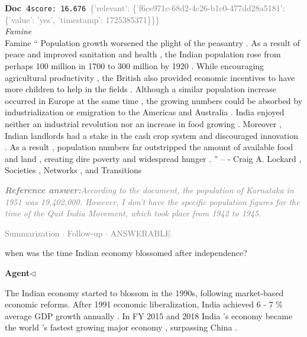 \documentclass[a4paper,11pt]{article}
\begin{document}
\begin{docenv}
{\footnotesize\textcolor{doccolor}{\textbf{Doc~4}}}\hfill{\tiny\texttt{score:~16.676}}\ {\tiny\textcolor{gray}{\{'relevant': \{'f6ce971c-68d2-4c26-b1c0-477dd28a5181': \{'value': 'yes', 'timestamp': 1725385371\}\}\}}}\\[3pt]
{\small\textit{Famine}}\\[2pt]
\vspace{2pt}
{\footnotesize Famine
`` Population growth worsened the plight of the peasantry . As a result of peace and improved sanitation and health , the Indian population rose from perhaps 100 million in 1700 to 300 million by 1920 . While encouraging agricultural productivity , the British also provided economic incentives to have more children to help in the fields . Although a similar population increase occurred in Europe at the same time , the growing numbers could be absorbed by industrialization or emigration to the Americas and Australia . India enjoyed neither an industrial revolution nor an increase in food growing . Moreover , Indian landlords had a stake in the cash crop system and discouraged innovation . As a result , population numbers far outstripped the amount of available food and land , creating dire poverty and widespread hunger . '' -- - Craig A. Lockard , Societies , Networks , and Transitions}
\end{docenv}
\begin{refanswerenv}
{\footnotesize\textit{\textcolor{gray}{\textbf{Reference answer:}\enspace According to the document, the population of Karnataka in 1951 was 19,402,000. However, I don't have the specific population figures for the time of the Quit India Movement, which took place from 1942 to 1945.}}}
\end{refanswerenv}
\vspace{0.5em}
\hfill{\tiny\textcolor{gray}{Summarization $\cdot$ Follow-up $\cdot$ ANSWERABLE}}
\begin{userbubble}
when was the time Indian economy blossomed after independence?
\end{userbubble}
\noindent\hfill{\small\textcolor{agentcolor}{\textbf{Agent\enspace$\triangleleft$}}}
\begin{agentbubble}
The Indian economy started to blossom in the 1990s, following market-based economic reforms.  After 1991 economic liberalization, India achieved 6 - 7 \% average GDP growth annually . In FY 2015 and 2018 India 's economy became the world 's fastest growing major economy , surpassing China . 
\end{agentbubble}
\end{document}
